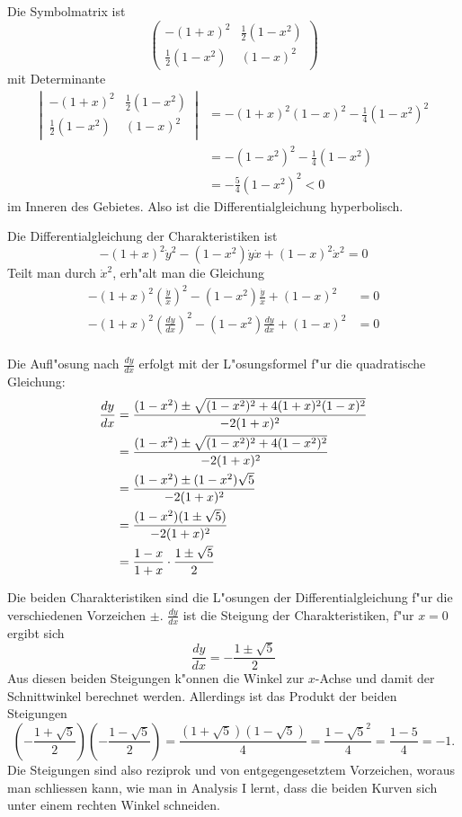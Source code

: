 \begin{loesung}
\begin{teilaufgaben}
\item Die Symbolmatrix ist
\[
\begin{pmatrix}
-(1+x)^2&\frac12(1-x^2)\\
\frac12(1-x^2)&(1-x)^2
\end{pmatrix}
\]
mit Determinante
\begin{align*}
\left|\,\begin{matrix}
-(1+x)^2&\frac12(1-x^2)\\
\frac12(1-x^2)&(1-x)^2
\end{matrix}\,\right|&=
-(1+x)^2(1-x)^2-\frac14(1-x^2)^2
\\
&=-(1-x^2)^2-\frac14(1-x^2)
\\
&=-\frac54(1-x^2)^2<0
\end{align*}
im Inneren des Gebietes. Also ist die Differentialgleichung hyperbolisch.
\item Die Differentialgleichung der Charakteristiken ist
\[
-(1+x)^2\dot y^2-(1-x^2)\dot y\dot x+(1-x)^2\dot x^2=0
\]
Teilt man durch $\dot x^2$, erh"alt man die Gleichung
\begin{align*}
-(1+x)^2\left(\frac{\dot y}{\dot x}\right)^2
-(1-x^2)\frac{\dot y}{\dot x}
+(1-x)^2&=0\\
-(1+x)^2\left(\frac{dy}{dx}\right)^2
-(1-x^2)\frac{dy}{dx}
+(1-x)^2&=0\\
\end{align*}
\item Die Aufl"osung nach $\frac{dy}{dx}$ erfolgt mit der L"osungsformel
f"ur die quadratische Gleichung:
\begin{align*}
\frac{dy}{dx}
&=
\frac{(1-x^2)\pm\sqrt{(1-x^2)^2+4(1+x)^2(1-x)^2}}{-2(1+x)^2}
\\
&=
\frac{(1-x^2)\pm\sqrt{(1-x^2)^2+4(1-x^2)^2}}{-2(1+x)^2}
\\
&=
\frac{(1-x^2)\pm(1-x^2)\sqrt{5}}{-2(1+x)^2}
\\
&=
\frac{(1-x^2)(1\pm\sqrt{5})}{-2(1+x)^2}
\\
&=
\-\frac{1-x}{1+x}\cdot\frac{1\pm\sqrt{5}}{2}
\end{align*}
\item
Die beiden Charakteristiken sind die L"osungen der Differentialgleichung
f"ur die verschiedenen Vorzeichen $\pm$. $\frac{dy}{dx}$ ist die
Steigung der Charakteristiken, f"ur $x=0$ ergibt sich
\[
\frac{dy}{dx}
=
-\frac{1\pm\sqrt{5}}{2}
\]
Aus diesen beiden Steigungen
k"onnen die Winkel zur $x$-Achse und damit der Schnittwinkel
berechnet werden. Allerdings ist das Produkt der beiden Steigungen
\[
\left(-\frac{1+\sqrt{5}}{2}\right)
\left(-\frac{1-\sqrt{5}}{2}\right)
=\frac{(1+\sqrt{5})(1-\sqrt{5})}{4}=
\frac{1-\sqrt{5}^2}{4}=\frac{1-5}{4}
=-1.
\]
Die Steigungen sind also reziprok und von entgegengesetztem Vorzeichen,
woraus man schliessen kann, wie man in Analysis I lernt, dass die
beiden Kurven sich unter einem rechten Winkel schneiden.
\end{teilaufgaben}
\end{loesung}
